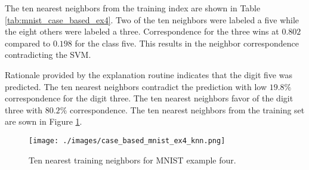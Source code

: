 The ten nearest neighbors from the training index are shown in Table
\ref{tab:mnist_case_based_ex4}.  Two of the ten neighbors were labeled a five
while the eight others were labeled a three.  Correspondence for the three wins
at $0.802$ compared to $0.198$ for the class five. This results in the neighbor
correspondence contradicting the SVM.

Rationale provided by the explanation routine indicates that the digit five was
predicted. The ten nearest neighbors contradict the prediction with low $19.8\%$
correspondence for the digit three. The ten nearest neighbors favor of the digit
three with $80.2\%$ correspondence. The ten nearest neighbors from the training
set are sown in Figure \ref{fig:mnist_case_based_ex4_knn}.


\begin{figure}[H]
    \centerline{\texttt{[image: ./images/case\_based\_mnist\_ex4\_knn.png]}}
    \caption{Ten nearest training neighbors for MNIST example four.}
    \label{fig:mnist_case_based_ex4_knn}
\end{figure}
